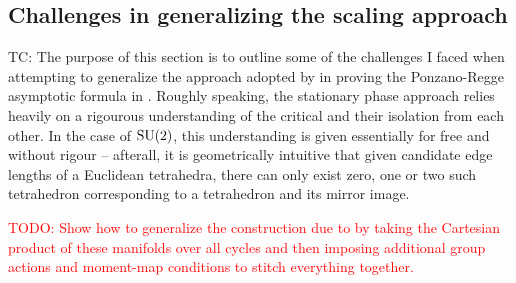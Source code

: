 \documentclass[notitlepage, 10pt]{article}
\begin{document}
\subsection{Challenges in generalizing the scaling approach}

{\color{blue} TC:
    The purpose of this section is to outline some of the challenges I faced when attempting to generalize the approach adopted by \citeauthor{roberts1999classical} in proving the Ponzano-Regge asymptotic formula in \cite{roberts1999classical}.
    Roughly speaking, the stationary phase approach relies heavily on a rigourous understanding of the critical and their isolation from each other.
    In the case of $\operatorname{SU}(2)$, this understanding is given essentially for free and without rigour -- afterall, it is geometrically intuitive that given candidate edge lengths of a Euclidean tetrahedra, there can only exist zero, one or two such tetrahedron corresponding to a tetrahedron and its mirror image.
}

\textcolor{red}{TODO: Show how to generalize the construction due to \citeauthor{roberts1999classical} \cite{roberts1999classical} by taking the Cartesian product of these manifolds over all cycles and then imposing additional group actions and moment-map conditions to stitch everything together.}
\end{document}
